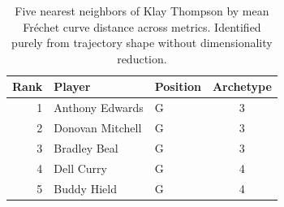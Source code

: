 \begin{table}[htbp]
  \centering\small
  \begin{tabular}{rllc}
    \toprule
    Rank & Player & Position & Archetype \\
    \midrule
    1 & Anthony Edwards & G & 3 \\
    2 & Donovan Mitchell & G & 3 \\
    3 & Bradley Beal & G & 3 \\
    4 & Dell Curry & G & 4 \\
    5 & Buddy Hield & G & 4 \\
    \bottomrule
  \end{tabular}
  \caption{Five nearest neighbors of Klay Thompson by mean Fr\'{e}chet curve distance across metrics. Identified purely from trajectory shape without dimensionality reduction.}
  \label{tab:Klay_Thompson_frechet_curve_neighbors}
\end{table}

